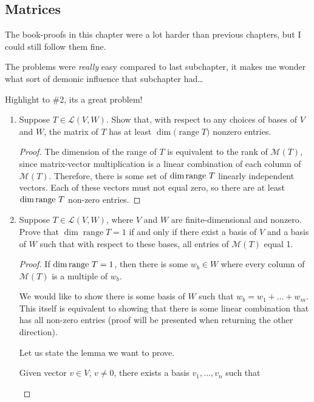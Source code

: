 \subsection{Matrices}

The book-proofs in this chapter were a lot harder than previous chapters, but I could still follow them fine.

The problems were \emph{really} easy compared to last subchapter, it makes me wonder what sort of demonic influence that subchapter had\dots

Highlight to \#2, its a great problem!

\begin{enumerate}
    \item[1] Suppose $T\in\mathcal{L}(V,W)$. Show that, with respect to any choices of bases of $V$ and $W$, the matrix of $T$ has at least $\dim\big(\operatorname{range} T\big)$ nonzero entries.
    
    \begin{proof}
        The dimension of the range of $T$ is equivalent to the rank of $\mathcal M(T)$, since matrix-vector multiplication is a linear combination of each column of $\mathcal M(T)$. Therefore, there is some set of $\dim \text{range } T$ linearly independent vectors. Each of these vectors must not equal zero, so there are at least $\dim \text{range } T$ non-zero entries.
    \end{proof}

    \item[2] Suppose $T \in \mathcal{L}(V, W)$, where $V$ and $W$ are finite-dimensional and nonzero. Prove that $\dim \operatorname{range} T = 1$ if and only if there exist a basis of $V$ and a basis of $W$ such that with respect to these bases, all entries of $\mathcal{M}(T)$ equal 1.
    
    \begin{proof}
        If $\dim \text{range } T = 1$, then there is some $w_b \in W$ where every column of $\mathcal M(T)$ is a multiple of $w_b$. 

        We would like to show there is some basis of $W$ such that $w_b = w_1 + \dots + w_m$. This itself is equivalent to showing that there is some linear combination that has all non-zero entries (proof will be presented when returning the other direction). 

        Let us state the lemma we want to prove.

        \begin{lemma*}
            Given vector $v \in V$, $v \neq 0$, there exists a basis $v_1, \dots, v_n$ such that 
            

\end{lemma*}
\end{proof}
\end{enumerate}
